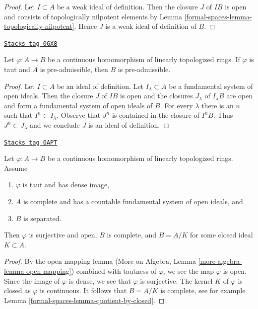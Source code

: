 \begin{proof}
Let $I \subset A$ be a weak ideal of definition. Then the closure
$J$ of $IB$ is open and consists of topologically nilpotent elements
by Lemma \ref{formal-spaces-lemma-topologically-nilpotent}. Hence $J$ is a weak
ideal of definition of $B$.
\end{proof}

\begin{lemma}
\label{formal-spaces-lemma-taut-ascent-admissible}
\href{https://stacks.math.columbia.edu/tag/0GX8}{\texttt{Stacks tag 0GX8}}

Let $\varphi : A \to B$ be a continuous homomorphism of
linearly topologized rings. If $\varphi$ is taut and $A$
is pre-admissible, then $B$ is pre-admissible.
\end{lemma}

\begin{proof}
Let $I \subset A$ be an ideal of definition. Let
$I_\lambda \subset A$ be a fundamental system of open ideals.
Then the closure $J$ of $IB$ is open and the
closures $J_\lambda$ of $I_\lambda B$ are open and form a
fundamental system of open ideals of $B$.
For every $\lambda$ there is an $n$ such that $I^n \subset I_\lambda$.
Observe that $J^n$ is contained in the closure of $I^nB$.
Thus $J^n \subset J_\lambda$ and we conclude $J$ is an
ideal of definition.
\end{proof}

\begin{lemma}
\label{formal-spaces-lemma-dense-image-surjective}
\href{https://stacks.math.columbia.edu/tag/0APT}{\texttt{Stacks tag 0APT}}

Let $\varphi : A \to B$ be a continuous homomorphism of
linearly topologized rings. Assume
\begin{enumerate}
\item $\varphi$ is taut and has dense image,
\item $A$ is complete and has a countable fundamental system of
open ideals, and
\item $B$ is separated.
\end{enumerate}
Then $\varphi$ is surjective and open, $B$ is complete, and $B = A/K$ for
some closed ideal $K \subset A$.
\end{lemma}

\begin{proof}
By the open mapping lemma (More on Algebra, Lemma
\ref{more-algebra-lemma-open-mapping})
combined with tautness of $\varphi$,
we see the map $\varphi$ is open. Since the image of $\varphi$
is dense, we see that $\varphi$ is surjective. The kernel $K$
of $\varphi$ is closed as $\varphi$ is continuous.
It follows that $B = A/K$ is complete, see for example
Lemma \ref{formal-spaces-lemma-quotient-by-closed}.
\end{proof}

